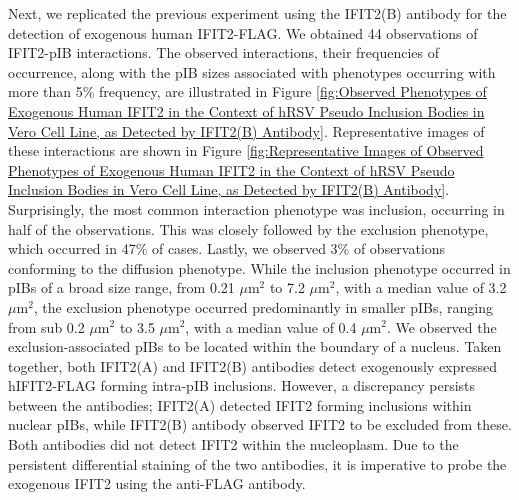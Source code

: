 Next, we replicated the previous experiment using the IFIT2(B) antibody for the detection of exogenous human IFIT2-FLAG. We obtained 44 observations of IFIT2-pIB interactions. The observed interactions, their frequencies of occurrence, along with the pIB sizes associated with phenotypes occurring with more than 5\% frequency, are illustrated in Figure \ref{fig:Observed Phenotypes of Exogenous Human IFIT2 in the Context of hRSV Pseudo Inclusion Bodies in Vero Cell Line, as Detected by IFIT2(B) Antibody}. Representative images of these interactions are shown in Figure \ref{fig:Representative Images of Observed Phenotypes of Exogenous Human IFIT2 in the Context of hRSV Pseudo Inclusion Bodies in Vero Cell Line, as Detected by IFIT2(B) Antibody}. Surprisingly, the most common interaction phenotype was inclusion, occurring in half of the observations. This was closely followed by the exclusion phenotype, which occurred in 47\% of cases. Lastly, we observed 3\% of observations conforming to the diffusion phenotype. While the inclusion phenotype occurred in pIBs of a broad size range, from 0.21 \(\mu \mbox{m}^2\) to 7.2 \(\mu \mbox{m}^2\), with a median value of 3.2 \(\mu \mbox{m}^2\), the exclusion phenotype occurred predominantly in smaller pIBs, ranging from sub 0.2 \(\mu \mbox{m}^2\) to 3.5 \(\mu \mbox{m}^2\), with a median value of 0.4 \(\mu \mbox{m}^2\). We observed the exclusion-associated pIBs to be located within the boundary of a nucleus. Taken together, both IFIT2(A) and IFIT2(B) antibodies detect exogenously expressed hIFIT2-FLAG forming intra-pIB inclusions. However, a discrepancy persists between the antibodies; IFIT2(A) detected IFIT2 forming inclusions within nuclear pIBs, while IFIT2(B) antibody observed IFIT2 to be excluded from these. Both antibodies did not detect IFIT2 within the nucleoplasm. Due to the persistent differential staining of the two antibodies, it is imperative to probe the exogenous IFIT2 using the anti-FLAG antibody.

